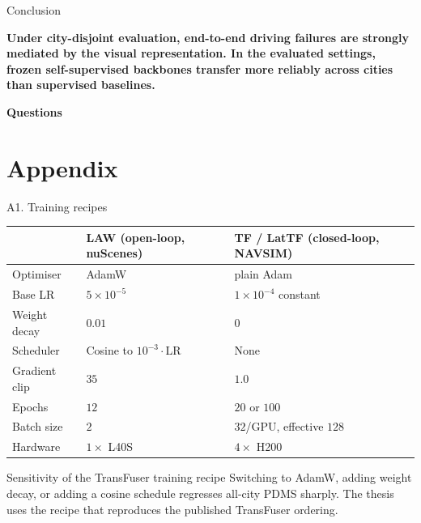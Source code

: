 \documentclass[aspectratio=169, xcolor={table}]{beamer}
\begin{document}
\begin{frame}{Conclusion}
  \begin{block}{}
    \centering\large
    \textbf{Under city-disjoint evaluation, end-to-end driving failures are strongly mediated by the visual representation. In the evaluated settings, frozen self-supervised backbones transfer more reliably across cities than supervised baselines.}
  \end{block}
  \vspace{10pt}
  \centering
  \textbf{Questions}
\end{frame}

\appendix

\section*{Appendix}

\begin{frame}{A1. Training recipes}
  \centering\scriptsize
  \begin{tabular}{@{}l l l@{}}
    \toprule
    & \textbf{LAW (open-loop, nuScenes)} & \textbf{TF / LatTF (closed-loop, NAVSIM)} \\
    \midrule
    Optimiser      & AdamW                & plain Adam \\
    Base LR        & $5\times10^{-5}$     & $1\times10^{-4}$ constant \\
    Weight decay   & $0.01$               & $0$ \\
    Scheduler      & Cosine to $10^{-3}\!\cdot\!$LR & None \\
    Gradient clip  & $35$                 & $1.0$ \\
    Epochs         & $12$                 & $20$ or $100$ \\
    Batch size     & $2$                  & $32$/GPU, effective $128$ \\
    Hardware       & $1\times$ L40S       & $4\times$ H200 \\
    \bottomrule
  \end{tabular}
  \vspace{6pt}
  \begin{block}{Sensitivity of the TransFuser training recipe}
    \footnotesize Switching to AdamW, adding weight decay, or adding a cosine schedule regresses all-city PDMS sharply. The thesis uses the recipe that reproduces the published TransFuser ordering.
  \end{block}
\end{frame}
\end{document}
